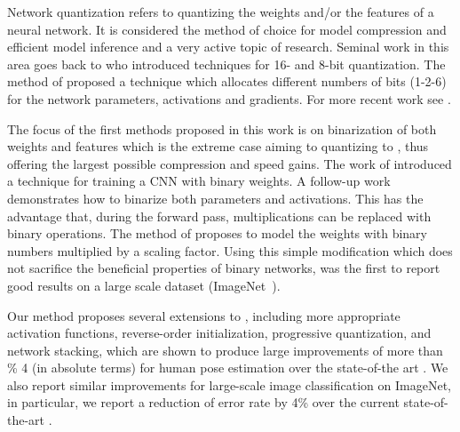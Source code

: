 \documentclass[10pt,twocolumn,letterpaper]{article}
\begin{document}
Network quantization refers to quantizing the weights and/or the features of a neural network. It is considered the method of choice for model compression and efficient model inference and a very active topic of research. Seminal work in this area goes back to \cite{courbariaux2014training, lin2015fixed} who introduced techniques for 16- and 8-bit quantization. The method of \cite{zhou2016dorefa} proposed a technique which allocates different numbers of bits (1-2-6) for the network parameters, activations and gradients. For more recent work see \cite{tung2018clip,wu2016quantized,zhou2018explicit,tang2018quantized}.

The focus of the first methods proposed in this work is on binarization of both weights and features which is the extreme case aiming to quantizing to , thus offering the largest possible compression and speed gains. The work of \cite{courbariaux2015binaryconnect} introduced a technique for training a CNN with binary weights. A follow-up work \cite{courbariaux2016binarized} demonstrates how to binarize both parameters and activations. This has the advantage that, during the forward pass, multiplications can be replaced with binary operations. The method of \cite{rastegari2016xnor} proposes to model the weights with binary numbers multiplied by a scaling factor. Using this simple modification which does not sacrifice the beneficial properties of binary networks, \cite{rastegari2016xnor} was the first to report good results on a large scale dataset (ImageNet~\cite{deng2009imagenet}). 

Our method proposes several extensions to \cite{rastegari2016xnor}, including more appropriate activation functions, reverse-order initialization, progressive quantization, and network stacking, which are shown to produce large improvements of more than \% 4 (in absolute terms) for human pose estimation over the state-of-the art \cite{bulat2017binarized}. We also report similar improvements for large-scale image classification on ImageNet, in particular, we report a reduction of error rate by 4\% over the current state-of-the-art \cite{rastegari2016xnor}.
\end{document}
